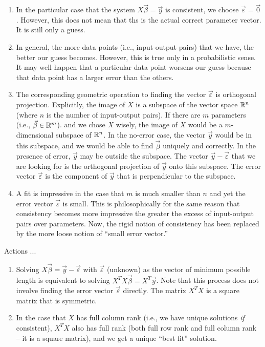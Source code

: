 \documentclass[10pt]{amsart}
\begin{document}
\begin{enumerate}
{    regression} (the default type of regression) but we could use
  alternative notions of length in other types of regressions.
\item In the particular case that the system $X \vec{\beta} = \vec{y}$
  is consistent, we choose $\vec{\varepsilon} = \vec{0}$. However,
  this does not mean that ths is the actual correct parameter
  vector. It is still only a guess.
\item In general, the more data points (i.e., input-output pairs) that
  we have, the better our guess becomes. However, this is true only in
  a probabilistic sense. It may well happen that a particular data
  point worsens our guess because that data point has a larger error
  than the others.
\item The corresponding geometric operation to finding the vector
  $\vec{\varepsilon}$ is orthogonal projection. Explicitly, the image
  of $X$ is a subspace of the vector space $\mathbb{R}^n$ (where $n$ is the
  number of input-output pairs). If there are $m$ parameters (i.e.,
  $\vec{\beta} \in \mathbb{R}^m$). and we chose $X$ wisely, the image of $X$
  would be a $m$-dimensional subspace of $\mathbb{R}^n$. In the no-error case,
  the vector $\vec{y}$ would be in this subspace, and we would be able
  to find $\vec{\beta}$ uniquely and correctly. In the presence of
  error, $\vec{y}$ may be outside the subspace. The vector $\vec{y} -
  \vec{\varepsilon}$ that we are looking for is the orthogonal
  projection of $\vec{y}$ onto this subspace. The error vector
  $\vec{\varepsilon}$ is the component of $\vec{y}$ that is
  perpendicular to the subspace.
\item A fit is impressive in the case that $m$ is much smaller than
  $n$ and yet the error vector $\vec{\varepsilon}$ is small. This is
  philosophically for the same reason that consistency becomes more
  impressive the greater the excess of input-output pairs over
  parameters. Now, the rigid notion of consistency has been replaced
  by the more loose notion of ``small error vector.''
\end{enumerate}

Actions ...

\begin{enumerate}
\item Solving $X\vec{\beta} = \vec{y} - \vec{\varepsilon}$ with
  $\vec{\varepsilon}$ (unknown) as the vector of minimum possible
  length is equivalent to solving $X^TX\vec{\beta} = X^T\vec{y}$. Note
  that this process does not involve finding the error vector
  $\vec{\varepsilon}$ directly. The matrix $X^TX$ is a square matrix
  that is symmetric.
\item In the case that $X$ has full column rank (i.e., we have unique
  solutions {\em if} consistent), $X^TX$ also has full rank (both full
  row rank and full column rank -- it is a square matrix), and we get a
  unique ``best fit'' solution.
\end{enumerate}
\end{document}
